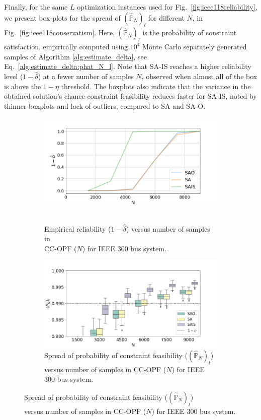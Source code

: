 Finally, for the same $L$ optimization instances used for Fig.~\ref{fig:ieee118reliability}, we present box-plots for the spread of $(\hat{\mathbb{P}}_N)_l$ for different $N$, in Fig.~\ref{fig:ieee118conservatism}. Here, $(\hat{\mathbb{P}}_N)_l$ is the probability of constraint satisfaction, empirically computed using $10^4$ Monte Carlo separately generated samples of Algorithm \ref{alg:estimate_delta}, see Eq.~\ref{alg:estimate_delta:phat_N_l}. Note that SA-IS reaches a higher reliability level ($1-\hat{\delta}$) at a fewer number of samples $N$, observed when almost all of the box is above the $1-\eta$ threshold. The boxplots also indicate that the variance in the obtained solution's chance-constraint feasibility reduces faster for SA-IS, noted by thinner boxplots and lack of outliers, compared to SA and SA-O.

\begin{figure}[hbt]

\begin{subfigure}{.48\textwidth}
  \centering
  \hspace{-4mm}\includegraphics[width=0.9\linewidth]{Dissertation/images/dc_stochastic_approx/case300/1_beta_N_12000_eta_001.png}~~~~~~\hfill
  \caption{Empirical reliability ($1-\hat{\delta}$) versus number of samples in \\CC-OPF ($N$) for IEEE 300 bus system.}
  \label{fig:ieee300reliability}
\end{subfigure}
\begin{subfigure}{.48\textwidth}
  \centering
  \hspace{-8mm}\includegraphics[width=0.9\linewidth]{Dissertation/images/dc_stochastic_approx/case300/boxplot_J_N_9000_eta_001.png}
  \caption{Spread of probability of constraint feasibility ($(\hat{\mathbb{P}}_N)_l$) \\versus number of samples in CC-OPF ($N$) for IEEE 300 bus system.}
  \label{fig:ieee300conservatism}
\end{subfigure}


\end{figure}
